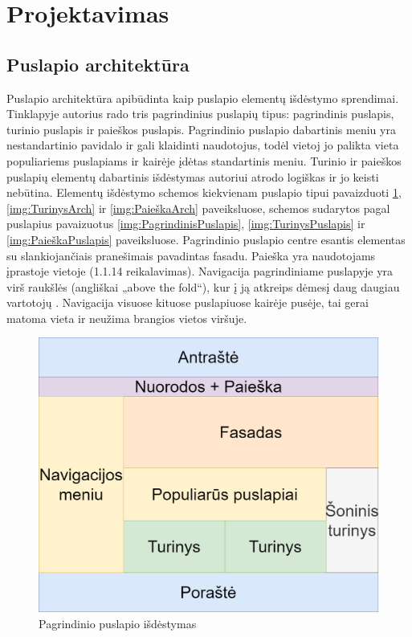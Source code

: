 \documentclass{VUMIFPSkursinis}
\begin{document}
\section{Projektavimas}
\subsection{Puslapio architektūra}
Puslapio architektūra apibūdinta kaip puslapio elementų išdėstymo sprendimai. Tinklapyje autorius rado tris pagrindinius puslapių tipus: pagrindinis puslapis, turinio puslapis ir paieškos puslapis. Pagrindinio puslapio dabartinis meniu yra nestandartinio pavidalo ir gali klaidinti naudotojus, todėl vietoj jo palikta vieta populiariems puslapiams ir kairėje įdėtas standartinis meniu. Turinio ir paieškos puslapių elementų dabartinis išdėstymas autoriui atrodo logiškas ir jo keisti nebūtina. Elementų išdėstymo schemos kiekvienam puslapio tipui pavaizduoti \ref{img:PagrindinisArch}, \ref{img:TurinysArch} ir \ref{img:PaieškaArch} paveiksluose, schemos sudarytos pagal puslapius pavaizuotus \ref{img:PagrindinisPuslapis}, \ref{img:TurinysPuslapis} ir \ref{img:PaieškaPuslapis} paveiksluose. Pagrindinio puslapio centre esantis elementas su slankiojančiais pranešimais pavadintas fasadu. Paieška yra naudotojams įprastoje vietoje (1.1.14 reikalavimas). Navigacija pagrindiniame puslapyje yra virš raukšlės (angliškai „above the fold“), kur į ją atkreips dėmesį daug daugiau vartotojų \cite{Scrolling}. Navigacija visuose kituose puslapiuose kairėje pusėje, tai gerai matoma vieta \cite{AttentionLeft} ir neužima brangios vietos viršuje.

\begin{figure}[htb]
    \centering
    \includegraphics[scale=0.25]{img/PuslapioArchPagrindinis}
    \caption{Pagrindinio puslapio išdėstymas}
    \label{img:PagrindinisArch}
\end{figure}
\end{document}
